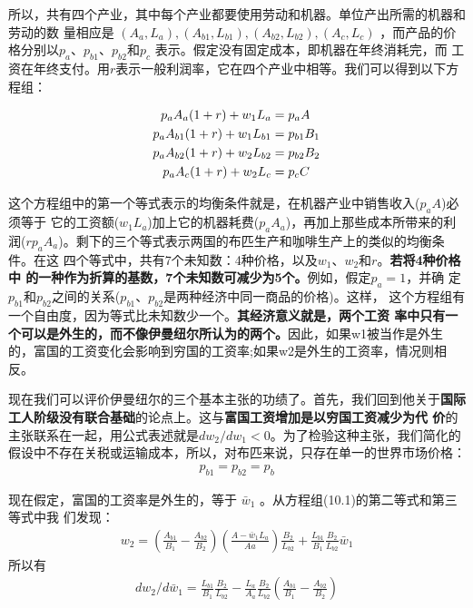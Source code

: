 所以，共有四个产业，其中每个产业都要使用劳动和机器。单位产出所需的机器和劳动的数
量相应是 $(A_a, L_a), (A_{b1}, L_{b1}),(A_{b2}, L_{b2}),(A_c, L_c)$ ，而产品的价
格分别以$p_a、p_{b1}、p_{b2}和p_c$ 表示。假定没有固定成本，即机器在年终消耗完，而
工资在年终支付。用$r$表示一般利润率，它在四个产业中相等。我们可以得到以下方程组：

\begin{align}
p_aA_a   (1+r)+w_1L_a &= p_aA \notag \\
p_aA_{b1} (1+r)+w_1L_{b1} &= p_{b1}B_1  \notag \\
p_aA_{b2} (1+r)+w_2L_{b2} &= p_{b2}B_2 \notag \\
p_aA_c   (1+r)+w_2L_c &= p_cC
\end{align}

这个方程组中的第一个等式表示的均衡条件就是，在机器产业中销售收入($p_aA$)必须等于
它的工资额($w_1L_a$)加上它的机器耗费($p_aA_a$)，再加上那些成本所带来的利
润($rp_aA_a$)。剩下的三个等式表示两国的布匹生产和咖啡生产上的类似的均衡条件。在这
四个等式中，共有7个未知数：4种价格，以及$w_1$、$w_2$和$r$。\textbf{若将4种价格中
  的一种作为折算的基数，7个未知数可减少为5个。}例如，假定$p_a=1$，并确
定$p_{b1}$和$p_{b2}$之间的关系($p_{b1}、p_{b2}$是两种经济中同一商品的价格)。这样，
这个方程组有一个自由度，因为等式比未知数少一个。\textbf{其经济意义就是，两个工资
  率中只有一个可以是外生的，而不像伊曼纽尔所认为的两个。}因此，如果w1被当作是外生
的，富国的工资变化会影响到穷国的工资率;如果w2是外生的工资率，情况则相反。

现在我们可以评价伊曼纽尔的三个基本主张的功绩了。首先，我们回到他关于\textbf{国际
  工人阶级没有联合基础}的论点上。这与\textbf{富国工资增加是以穷国工资减少为代
  价}的主张联系在一起，用公式表述就是$dw_2 / dw_1<0$。为了检验这种主张，我们简化的
假设中不存在关税或运输成本，所以，对布匹来说，只存在单一的世界市场价格：
\begin{gather}
p_{b1}=p_{b2}=p_b
\end{gather}

现在假定，富国的工资率是外生的，等于 $\bar{w}_1$ 。从方程组(10.1)的第二等式和第三等式中我
们发现：
\begin{gather}
  w_2=\left(\frac{A_{b1}}{B_1} - \frac{A_{b2}}{B_2} \right)
  \left(\frac{A-\bar{w}_1L_a}{Aa} \right)\frac{B_2}{L_{b2}} +
  \frac{L_{b1}}{B_1}\frac{B_2}{L_{b2}}\bar{w}_1
\end{gather}
所以有
\begin{gather}
dw_2/d\bar{w}_1=\frac{L_{b1}}{B_1} \frac{B_2}{L_{b2}} - \frac{L_a}{A_a}
\frac{B_2}{L_{b2}} \left(\frac{A_{b1}}{B_1}-\frac{A_{b2}}{B_2} \right)
\end{gather}

